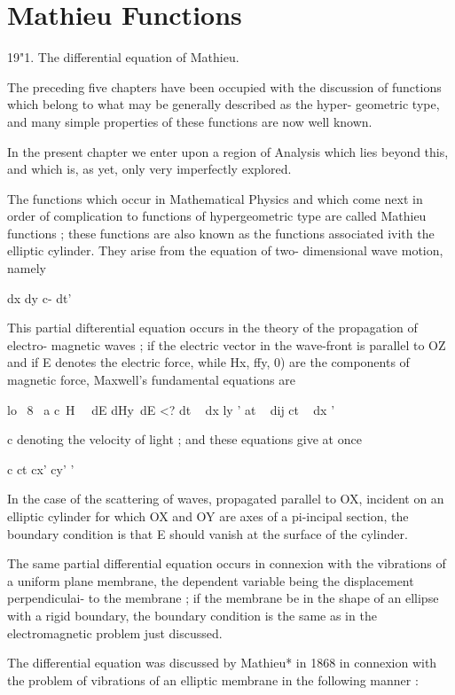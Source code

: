 \chapter{Mathieu Functions} 

19"1. The differential equation of Mathieu. 

The preceding five chapters have been occupied with the discussion of 
functions which belong to what may be generally described as the hyper- 
geometric type, and many simple properties of these functions are now well 
known. 

In the present chapter we enter upon a region of Analysis which lies 
beyond this, and which is, as yet, only very imperfectly explored. 

The functions which occur in Mathematical Physics and which come 
next in order of complication to functions of hypergeometric type are 
called Mathieu functions ; these functions are also known as the functions 
associated ivith the elliptic cylinder. They arise from the equation of two- 
dimensional wave motion, namely 

dx  dy  c- dt' 

This partial difterential equation occurs in the theory of the propagation of electro- 
magnetic waves ; if the electric vector in the wave-front is parallel to OZ and if E denotes 
the electric force, while  Hx, ffy, 0) are the components of magnetic force, Maxwell's 
fundamental equations are 

lo \ 8 \ a  c\ H \ \ dE dHy\ dE 
<? dt ~ dx ly ' at ~ dij   ct ~ dx ' 

c denoting the velocity of light ; and these equations give at once 

c  ct  cx'  cy'  ' 

In the case of the scattering of waves, propagated parallel to OX, incident on an 
elliptic cylinder for which OX and OY are axes of a pi-incipal section, the boundary 
condition is that E should vanish at the surface of the cylinder. 

The same partial differential equation occurs in connexion with the vibrations of 
a uniform plane membrane, the dependent variable being the displacement perpendiculai- 
to the membrane ; if the membrane be in the shape of an ellipse with a rigid boundary, 
the boundary condition is the same as in the electromagnetic problem just discussed. 

The differential equation was discussed by Mathieu* in 1868 in connexion 
with the problem of vibrations of an elliptic membrane in the following 
manner : 

